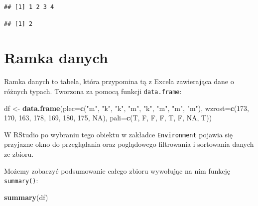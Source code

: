 \documentclass[]{book}
\newenvironment{Shaded}{\begin{snugshade}}{\end{snugshade}}
\newcommand{\KeywordTok}[1]{\textcolor[rgb]{0.13,0.29,0.53}{\textbf{#1}}}
\newcommand{\DataTypeTok}[1]{\textcolor[rgb]{0.13,0.29,0.53}{#1}}
\newcommand{\DecValTok}[1]{\textcolor[rgb]{0.00,0.00,0.81}{#1}}
\newcommand{\StringTok}[1]{\textcolor[rgb]{0.31,0.60,0.02}{#1}}
\newcommand{\OtherTok}[1]{\textcolor[rgb]{0.56,0.35,0.01}{#1}}
\newcommand{\OperatorTok}[1]{\textcolor[rgb]{0.81,0.36,0.00}{\textbf{#1}}}
\newcommand{\NormalTok}[1]{#1}
\begin{document}
\begin{verbatim}
## [1] 1 2 3 4
\end{verbatim}

\begin{Shaded}
\end{Shaded}

\begin{verbatim}
## [1] 2
\end{verbatim}

\section{Ramka danych}\label{ramka-danych}

Ramka danych to tabela, która przypomina tą z Excela zawierająca dane o
różnych typach. Tworzona za pomocą funkcji \texttt{data.frame}:

\begin{Shaded}
\begin{Highlighting}[]
\NormalTok{df <-}\StringTok{ }\KeywordTok{data.frame}\NormalTok{(}\DataTypeTok{plec=}\KeywordTok{c}\NormalTok{(}\StringTok{"m"}\NormalTok{, }\StringTok{"k"}\NormalTok{, }\StringTok{"k"}\NormalTok{, }\StringTok{"m"}\NormalTok{, }\StringTok{"k"}\NormalTok{, }\StringTok{"m"}\NormalTok{, }\StringTok{"m"}\NormalTok{, }\StringTok{"m"}\NormalTok{),}
                 \DataTypeTok{wzrost=}\KeywordTok{c}\NormalTok{(}\DecValTok{173}\NormalTok{, }\DecValTok{170}\NormalTok{, }\DecValTok{163}\NormalTok{, }\DecValTok{178}\NormalTok{, }\DecValTok{169}\NormalTok{, }\DecValTok{180}\NormalTok{, }\DecValTok{175}\NormalTok{, }\OtherTok{NA}\NormalTok{),}
                 \DataTypeTok{pali=}\KeywordTok{c}\NormalTok{(T, F, F, F, T, F, }\OtherTok{NA}\NormalTok{, T))}
\end{Highlighting}
\end{Shaded}

W RStudio po wybraniu tego obiektu w zakładce \texttt{Environment}
pojawia się przyjazne okno do przeglądania oraz poglądowego filtrowania
i sortowania danych ze zbioru.

Możemy zobaczyć podsumowanie całego zbioru wywołując na nim funkcję
\texttt{summary()}:

\begin{Shaded}
\begin{Highlighting}[]
\KeywordTok{summary}\NormalTok{(df)}
\end{Highlighting}
\end{Shaded}
\end{document}
